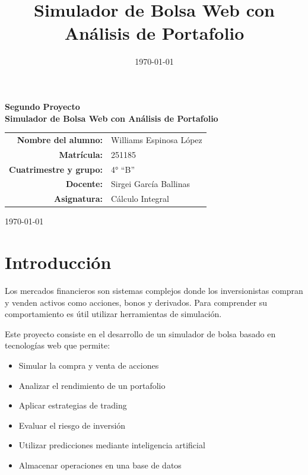 \documentclass[a4paper,12pt]{article}
\title{Simulador de Bolsa Web con Análisis de Portafolio}
\date{\today}
\begin{document}

\begin{titlepage}

\centering

\vspace*{2cm}

{\Large \textbf{Segundo Proyecto}}\\[1cm]

{\LARGE \textbf{Simulador de Bolsa Web con Análisis de Portafolio}}\\[3cm]

\begin{tabular}{rl}

\textbf{Nombre del alumno:} & Williams Espinosa López \\

\textbf{Matrícula:} & 251185 \\

\textbf{Cuatrimestre y grupo:} & 4° “B” \\

\textbf{Docente:} & Sirgei García Ballinas \\

\textbf{Asignatura:} & Cálculo Integral \\

\end{tabular}

\vfill

{\large \today}

\end{titlepage}


\section{Introducción}

Los mercados financieros son sistemas complejos donde los inversionistas compran y venden activos como acciones, bonos y derivados. Para comprender su comportamiento es útil utilizar herramientas de simulación.

Este proyecto consiste en el desarrollo de un simulador de bolsa basado en tecnologías web que permite:

\begin{itemize}
\item Simular la compra y venta de acciones
\item Analizar el rendimiento de un portafolio
\item Aplicar estrategias de trading
\item Evaluar el riesgo de inversión
\item Utilizar predicciones mediante inteligencia artificial
\item Almacenar operaciones en una base de datos
\end{itemize}
\end{document}
